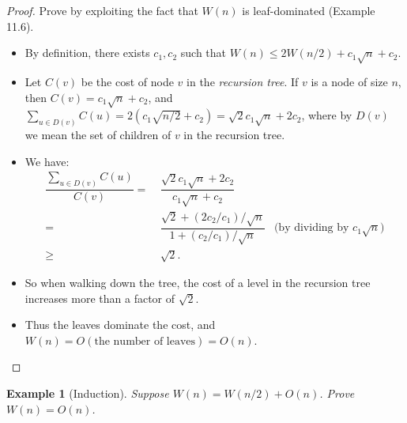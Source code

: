 \documentclass[11pt,a4paper,oneside,microtype,nokorean]{oblivoir}
\newtheorem{example}{Example}
\begin{document}
\begin{proof}
  Prove by exploiting the fact that $W(n)$ is leaf-dominated (Example 11.6).

  \begin{itemize}
  \item By definition, there exists $c_1,c_2$ such that $W(n) \le 2W(n/2) + c_1 \sqrt{n} + c_2.$
  \item Let $C(v)$ be the cost of node $v$ in the \emph{recursion tree}.  If $v$ is a node of size
    $n$, then $C(v) = c_1 \sqrt{n} + c_2$, and
    $\sum_{u \in D(v)} C(u) = 2(c_1 \sqrt{n/2} + c_2) = \sqrt{2} c_1 \sqrt{n} + 2 c_2$, where by
    $D(v)$ we mean the set of children of $v$ in the recursion tree.
  \item We have:
    \begin{align*}
      \dfrac{\sum_{u \in D(v)} C(u)}{C(v)}
      = &~ \dfrac{\sqrt{2} c_1 \sqrt{n} + 2 c_2}{c_1 \sqrt{n} + c_2} \\
      = &~ \dfrac{\sqrt{2} + (2 c_2 / c_1) / \sqrt{n}}{1 + (c_2 / c_1) / \sqrt{n}} & \mbox{(by dividing by $c_1 \sqrt{n}$)} \\
      \ge &~ \sqrt{2}.
    \end{align*}
  \item So when walking down the tree, the cost of a level in the recursion tree increases more than
    a factor of $\sqrt{2}$.
  \item Thus the leaves dominate the cost, and $W(n) = O(\mbox{the number of leaves}) = O(n)$.
  \end{itemize}
\end{proof}


\begin{example}[Induction] Suppose $W(n) = W(n/2) + O(n)$.  Prove $W(n) = O(n)$.
\end{example}
\end{document}
